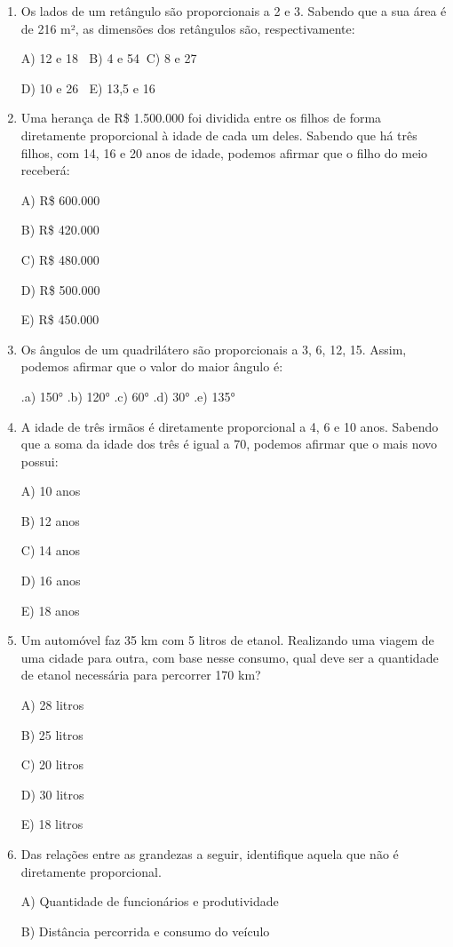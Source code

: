 \begin{multicols*}{2}
\begin{enumerate}
	\item Os lados de um retângulo são proporcionais a 2 e 3. Sabendo que a sua área é de 216 m², as dimensões dos retângulos são, respectivamente:

A) 12 e 18 $ \ $ B) 4 e 54$ \ $ C) 8 e 27

D) 10 e 26 $ \ $ E) 13,5 e 16

	\item Uma herança de R\$ 1.500.000 foi dividida entre os filhos de forma diretamente proporcional à idade de cada um deles. Sabendo que há três filhos, com 14, 16 e 20 anos de idade, podemos afirmar que o filho do meio receberá:

A) R\$ 600.000

B) R\$ 420.000

C) R\$ 480.000

D) R\$ 500.000

E) R\$ 450.000

	\item Os ângulos de um quadrilátero são proporcionais a 3, 6, 12, 15. Assim, podemos afirmar que o valor do maior ângulo é:
	
	.a) 150°  .b) 120°  .c) 60°  .d) 30°  .e) 135°

	\item A idade de três irmãos é diretamente proporcional a 4, 6 e 10 anos. Sabendo que a soma da idade dos três é igual a 70, podemos afirmar que o mais novo possui:

A) 10 anos

B) 12 anos

C) 14 anos

D) 16 anos

E) 18 anos

	\item Um automóvel faz 35 km com 5 litros de etanol. Realizando uma viagem de uma cidade para outra, com base nesse consumo, qual deve ser a quantidade de etanol necessária para percorrer 170 km?

A) 28 litros

B) 25 litros

C) 20 litros

D) 30 litros

E) 18 litros

	\item Das relações entre as grandezas a seguir, identifique aquela que não é diretamente proporcional.

A) Quantidade de funcionários e produtividade

B) Distância percorrida e consumo do veículo


\end{enumerate}
\end{multicols*}
